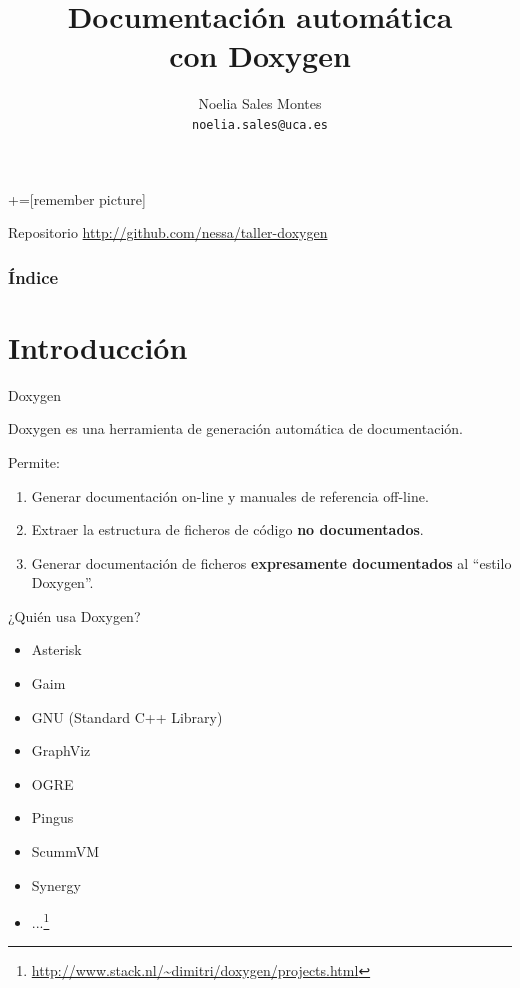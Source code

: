 \documentclass[12pt,xcolor=svgnames]{beamer}
\title[Doxygen]{Documentación automática\\ con Doxygen}
\author[Noelia Sales]{Noelia Sales Montes\\\texttt{noelia.sales@uca.es}}
\institute[DV - UCA]{Diseño de Videojuegos\\
Universidad de Cádiz}
\date{}
\begin{document}
+=[remember picture]
\everymath{\displaystyle}

\begin{frame}
 \titlepage
\end{frame}

\begin{frame}{Repositorio}
  \url{http://github.com/nessa/taller-doxygen}
\end{frame}

\begin{frame}
\frametitle{Índice} 
\transboxin
\tableofcontents
\end{frame}

\section{Introducción}

\begin{frame}{Doxygen}
  \begin{center}
   {\large Doxygen es una herramienta de generación automática de
     documentación.}
 \end{center}

 \pause
 Permite:
 \begin{enumerate}
 \item<2-> Generar documentación on-line y manuales de referencia off-line.
 \item<3-> Extraer la estructura de ficheros de código \textbf{no
     documentados}.
 \item<4-> Generar documentación de ficheros \textbf{expresamente documentados}
   al ``estilo Doxygen''.
 \end{enumerate}
\end{frame}

\begin{frame}{¿Quién usa Doxygen?}
  \begin{itemize}
  \item Asterisk
  \item Gaim
  \item GNU (Standard C++ Library)
  \item GraphViz
  \item OGRE
  \item Pingus
  \item ScummVM
  \item Synergy
  \item ...\footnote{{\scriptsize \url{http://www.stack.nl/~dimitri/doxygen/projects.html}}}
  \end{itemize}
\end{frame}
\end{document}
